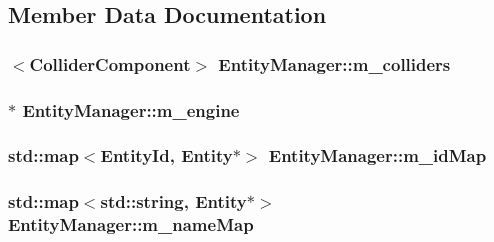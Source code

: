 \subsection{Member Data Documentation}
\hypertarget{classEntityManager_acdcb4eaa4584972dcfe49dc11f08e196}{
\subsubsection[{m\-\_\-colliders}]{$<${\bf Collider\-Component}$>$ Entity\-Manager\-::m\-\_\-colliders\hspace{0.3cm}{\ttfamily [private]}}}\label{classEntityManager_acdcb4eaa4584972dcfe49dc11f08e196}
\hypertarget{classEntityManager_aa6e686169c3667ffd84e6a3f0e2cfc62}{
\subsubsection[{m\-\_\-engine}]{$\ast$ Entity\-Manager\-::m\-\_\-engine\hspace{0.3cm}{\ttfamily [private]}}}\label{classEntityManager_aa6e686169c3667ffd84e6a3f0e2cfc62}
\hypertarget{classEntityManager_ab85b819de6db421c0272e76d5089bfbf}{
\subsubsection[{m\-\_\-id\-Map}]{\setlength{\rightskip}{0pt plus 5cm}std\-::map$<${\bf Entity\-Id}, {\bf Entity}$\ast$$>$ Entity\-Manager\-::m\-\_\-id\-Map\hspace{0.3cm}{\ttfamily [private]}}}\label{classEntityManager_ab85b819de6db421c0272e76d5089bfbf}
\hypertarget{classEntityManager_aba0769f85d9f51fe54494ab68e1ebf0e}{
\subsubsection[{m\-\_\-name\-Map}]{\setlength{\rightskip}{0pt plus 5cm}std\-::map$<$std\-::string, {\bf Entity}$\ast$$>$ Entity\-Manager\-::m\-\_\-name\-Map\hspace{0.3cm}{\ttfamily [private]}}}\label{classEntityManager_aba0769f85d9f51fe54494ab68e1ebf0e}
